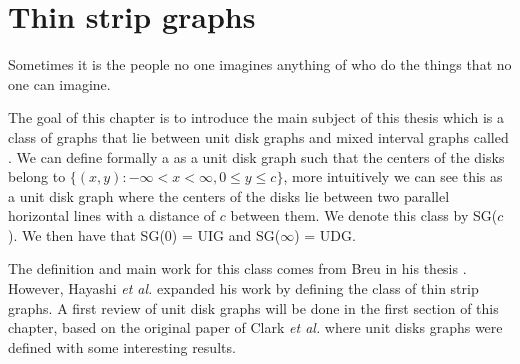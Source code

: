 \chapter{Thin strip graphs}
\label{chap:thinDef}

\begin{fquote}
  Sometimes it is the people no one imagines anything of who do the things that no one can imagine.
\end{fquote}

The goal of this chapter is to introduce the main subject of this thesis which is a class of graphs that lie between unit disk graphs
and mixed interval graphs called \emph{}. We can define formally a \emph{} as a unit disk graph such that the centers of the disks belong to $\{(x,y) : -\infty < x < \infty, 0 \leq y \leq c\}$, more intuitively we can see this as a unit disk graph where the centers of the disks lie between two parallel horizontal lines with a distance of $c$ between them. We denote this class by SG($c$). We then have that SG($0$) = UIG and SG($\infty$) = UDG.

The definition and main work for this class comes from Breu in his thesis \cite{breuAlgorithmicAspectsConstrained1996}. However, Hayashi \textit{et al.} \cite{hayashiThinStripGraphs2017} expanded his work by defining the class of thin strip graphs. A first review of unit disk graphs will be done in the first section of this chapter, based on the original paper of Clark \textit{et al.} \cite{CLARK1990165} where unit disks graphs were defined with some interesting results.

